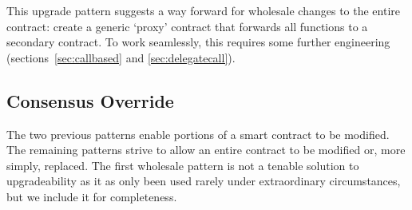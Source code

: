 This upgrade pattern suggests a way forward for wholesale changes to the entire contract: create a generic `proxy' contract that forwards all functions to a secondary contract. To work seamlessly, this requires some further engineering (sections~\ref{sec:callbased} and \ref{sec:delegatecall}).






\subsection{Consensus Override}
\label{sec:hardfork}

The two previous patterns enable portions of a smart contract to be modified. The remaining patterns strive to allow an entire contract to be modified or, more simply, replaced. The first wholesale pattern is not a tenable solution to upgradeability as it as only been used rarely under extraordinary circumstances, but we include it for completeness. 

